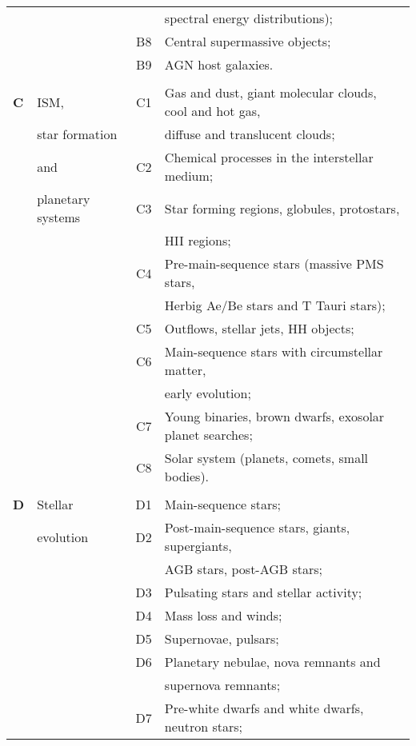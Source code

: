 \documentclass{article}
\begin{document}
\begin{table}[p]
{\begin{center}
\begin{tabular}{llcl}
       &           &    &  spectral energy distributions); \\  
       &           & B8 & Central supermassive objects; \\
       &           & B9 & AGN host galaxies. \\[4pt]
\hline
& & & \\[-6pt]
{\bf C}& ISM, & C1 & Gas and dust, giant molecular clouds, cool and hot gas,\\
       & star formation &   &  diffuse and translucent clouds; \\ 
       & and            &C2& Chemical processes in the interstellar medium; \\
       & planetary systems &C3& Star forming regions, globules, protostars, \\
       &      &    &  HII regions; \\
       &      & C4 & Pre-main-sequence stars (massive PMS stars, \\
       &      &    &  Herbig Ae/Be stars and T Tauri stars); \\  
       &      & C5 & Outflows, stellar jets, HH objects; \\
       &      & C6 & Main-sequence stars with circumstellar matter, \\
       &      &    &  early evolution;   \\
       &      & C7 & Young binaries, brown dwarfs, exosolar planet searches;\\ 
       &      & C8 & Solar system (planets, comets, small bodies). \\[4pt]  
\hline
& & & \\[-6pt]
{\bf D}& Stellar   & D1 & Main-sequence stars; \\
       & evolution & D2 & Post-main-sequence stars, giants, supergiants, \\
       &           &    &  AGB stars, post-AGB stars; \\
       &           & D3 & Pulsating stars and stellar activity; \\
       &           & D4 & Mass loss and winds; \\
       &           & D5 & Supernovae, pulsars; \\
       &           & D6 & Planetary nebulae, nova remnants and \\
       &           &    &  supernova remnants; \\
       &           & D7 & Pre-white dwarfs and white dwarfs, neutron stars; \\ 

\end{tabular}
\end{center}}
\end{table}
\end{document}
